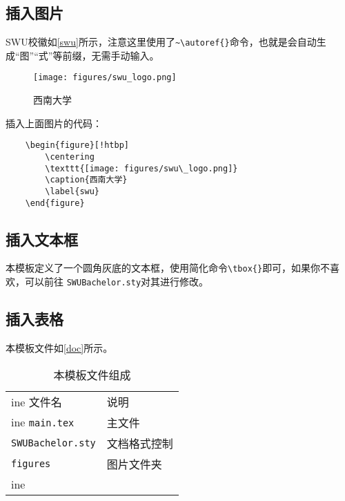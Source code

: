 \documentclass[zihao=-4,hyperref,a4paper,UTF8,autoindent=2em]{ctexart}
\begin{document}
\subsection{插入图片}
SWU校徽如\autoref{swu}所示，注意这里使用了\verb|~\autoref{}|命令，也就是会自动生成“图”“式”等前缀，无需手动输入。

\begin{figure}[!htbp]
    \centering
    \texttt{[image: figures/swu\_logo.png]}
    \caption{西南大学}
    \label{swu}
\end{figure}

插入上面图片的代码：

\begin{verbatim}
    \begin{figure}[!htbp]
        \centering
        \texttt{[image: figures/swu\_logo.png]}
        \caption{西南大学}
        \label{swu}
    \end{figure}
\end{verbatim}

\subsection{插入文本框}
本模板定义了一个圆角灰底的文本框，使用简化命令\verb|\tbox{}|即可，如果你不喜欢，可以前往 \texttt{SWUBachelor.sty}对其进行修改。


\subsection{插入表格}
本模板文件如\autoref{doc}所示。
\begin{table}[!htbp]
    \centering
    \begin{tabular}{l  | l}
     ine
        文件名 & 说明 \\
         ine
        \texttt{main.tex}  & 主文件 \\
        \texttt{SWUBachelor.sty}  & 文档格式控制\\
        \texttt{figures}  & 图片文件夹 \\
         ine
    \end{tabular}
    \caption{本模板文件组成}
    \label{doc}
\end{table}
\end{document}
